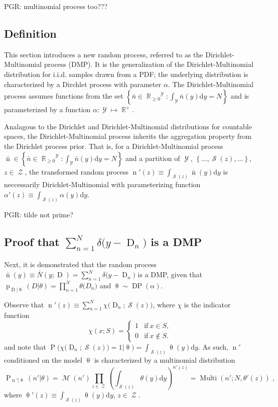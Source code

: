 \documentclass[12pt]{report}
\DeclareMathOperator{\Drm}{\mathrm{D}}
\DeclareMathOperator{\nrm}{\mathrm{n}}
\DeclareMathOperator{\Prm}{\mathrm{P}}
\DeclareMathOperator{\prm}{\mathrm{p}}
\DeclareMathOperator{\Ycal}{\mathcal{Y}}
\DeclareMathOperator{\Zcal}{\mathcal{Z}}
\DeclareMathOperator{\Mcal}{\mathcal{M}}
\DeclareMathOperator{\Scal}{\mathcal{S}}
\DeclareMathOperator{\Rbb}{\mathbb{R}}
\DeclareMathOperator{\Multi}{\mathrm{Multi}}
\DeclareMathOperator{\DP}{\mathrm{DP}}
\begin{document}
PGR: multinomial process too???

\subsection{Definition}

This section introduces a new random process, referred to as the Dirichlet-Multinomial process (DMP). It is the generalization of the Dirichlet-Multinomial distribution for i.i.d. samples drawn from a PDF; the underlying distribution is characterized by a Dirchlet process with parameter $\alpha$. The Dirichlet-Multinomial process assumes functions from the set $\left\{ \bar{n} \in {\Rbb_{\geq 0}}^{\Ycal} : \int_{\Ycal} \bar{n}(y) \mathrm{d} y = N \right\}$ and is parameterized by a function $\alpha : \Ycal \mapsto \Rbb^+$.

Analagous to the Dirichlet and Dirichlet-Multinomial distributions for countable spaces, the Dirichlet-Multinomial process inherits the aggregation property from the Dirichlet process prior. That is, for a Dirichlet-Multinomial process $\bar{\nrm} \in \left\{ \bar{n} \in {\Rbb_{\geq 0}}^{\Ycal} : \int_{\Ycal} \bar{n}(y) \mathrm{d} y = N \right\}$ and a partition of $\Ycal$, $\left\{ \ldots,\Scal(z),\ldots \right\}$, $z \in \Zcal$, the transformed random process $\nrm'(z) \equiv \int_{\Scal(z)} \bar{\nrm}(y) \mathrm{d} y$ is neccessarily Dirichlet-Multinomial with parameterizing function $\alpha'(z) \equiv \int_{\Scal(z)} \alpha(y) \mathrm{d} y$.

PGR: tilde not prime?

\subsection{Proof that $\sum_{n=1}^N \delta\big( y-\Drm_n \big)$ is a DMP}

Next, it is demonstrated that the random process $\bar{\nrm}(y) \equiv \bar{N}(y;\Drm) = \sum_{n=1}^N \delta\big( y-\Drm_n \big)$ is a DMP, given that $\prm_{\Drm|\uptheta}(D|\theta) = \prod_{n=1}^N \theta\big( D_n \big)$ and $\uptheta \sim \DP(\alpha)$. 

Observe that $\nrm'(z) \equiv \sum_{n=1}^N \chi\big( \Drm_n;\Scal(z) \big)$, where $\chi$ is the indicator function
\begin{equation}
\chi(x;S) = \begin{cases} 1 & \mathrm{if} \ x \in S, \\ 0 & \mathrm{if} \ x \notin S.  \end{cases}
\end{equation}
and note that $\Prm\Big( \chi\big( \Drm_n;\Scal(z) \big) = 1 \big| \uptheta \Big) = \int_{\Scal(z)} \uptheta(y) \mathrm{d} y$. As such, $\nrm'$ conditioned on the model $\uptheta$ is characterized by a multinomial distribution 
\begin{equation}
\Prm_{\nrm' | \uptheta}(n' | \theta) = \Mcal(n') \prod_{z \in \Zcal} \left( \int_{\Scal(z)} \theta(y) \mathrm{d} y \right)^{n'(z)} = \Multi\left( n' ; N,\theta'(z) \right) \;,
\end{equation}
where $\uptheta'(z) \equiv \int_{\Scal(z)} \uptheta(y) \mathrm{d} y$, $z \in \Zcal$.
\end{document}
